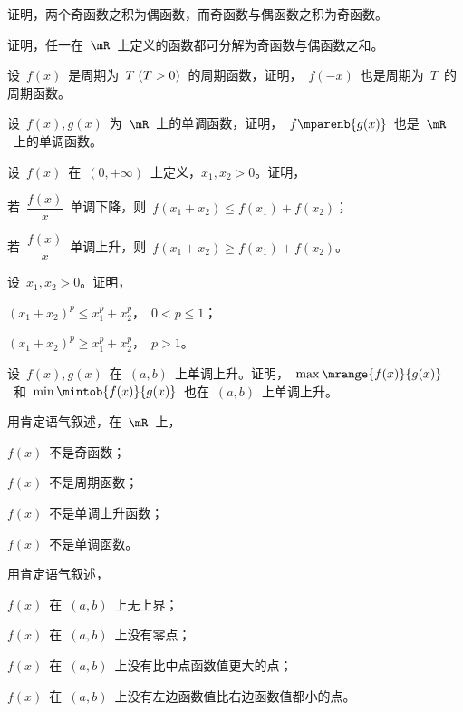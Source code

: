 \begin{exercise}
\begin{exlist}
\end{exlist}
\item 证明，两个奇函数之积为偶函数，而奇函数与偶函数之积为奇函数。
\item 证明，任一在~$\mR$~上定义的函数都可分解为奇函数与偶函数之和。
\item 设~$f(x)$~是周期为~$T\mcond{T>0}$~的周期函数，证明，~$f(-x)$~也是周期为~$T$~的周期函数。
\item 设~$f(x),g(x)$~为~$\mR$~上的单调函数，证明，~$f\mparenb{g(x)}$~也是~$\mR$~上的单调函数。
\item 设~$f(x)$~在~$(0,+\infty)$~上定义，$x_1,x_2>0$。证明，
\begin{exlist}
  \item 若~$\dfrac{f(x)}x$~单调下降，则~$f(x_1+x_2)\leq f(x_1)+f(x_2)$；
  \item 若~$\dfrac{f(x)}x$~单调上升，则~$f(x_1+x_2)\geq f(x_1)+f(x_2)$。
\end{exlist}
\item 设~$x_1,x_2>0$。证明，
\begin{exlistcols}
  \item $(x_1+x_2)^p\leq x_1^p+x_2^p$，~$0<p\leq1$；
  \item $(x_1+x_2)^p\geq x_1^p+x_2^p$，~$p>1$。
\end{exlistcols}
\item 设~$f(x),g(x)$~在~$(a,b)$~上单调上升。证明，~$\max\mrange{f(x)}{g(x)}$~和~$\min\mintob{f(x)}{g(x)}$~也在~$(a,b)$~上单调上升。
\item 用肯定语气叙述，在~$\mR$~上，
\begin{exlistcols}
  \item $f(x)$~不是奇函数；
  \item $f(x)$~不是周期函数；
  \item $f(x)$~不是单调上升函数；
  \item $f(x)$~不是单调函数。
\end{exlistcols}
\item 用肯定语气叙述，
\begin{exlistcols}
  \item $f(x)$~在~$(a,b)$~上无上界；
  \item $f(x)$~在~$(a,b)$~上没有零点；
  \item $f(x)$~在~$(a,b)$~上没有比中点函数值更大的点；
  \item $f(x)$~在~$(a,b)$~上没有左边函数值比右边函数值都小的点。
\end{exlistcols}
\end{exercise}

